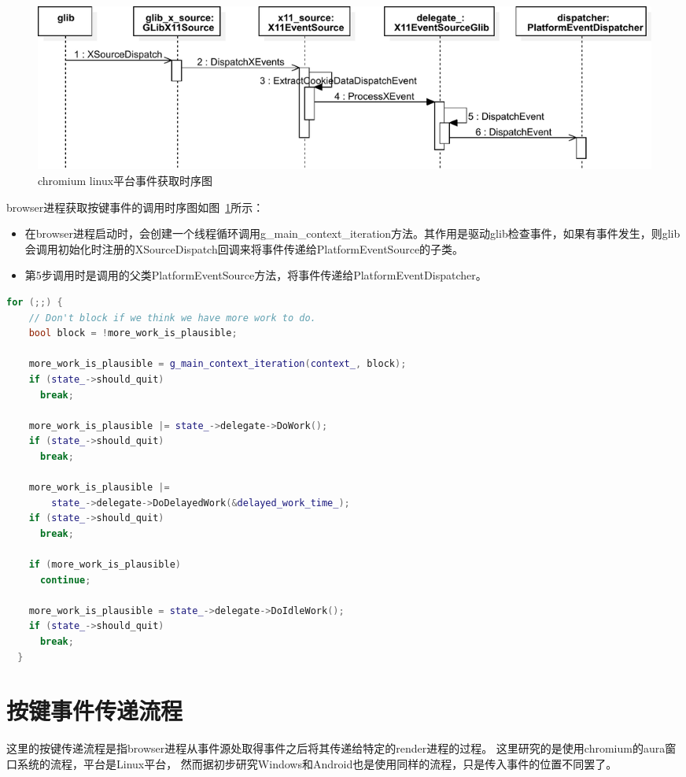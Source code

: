 \documentclass[12pt]{article}
\begin{document}
\begin{figure}[H] 
  \centering 
  \includegraphics[width=\textwidth]{image/linux_get_event_from_source.pdf} 
  \caption{chromium linux平台事件获取时序图} \label{fig:linux_get_event_from_source} 
\end{figure}

browser进程获取按键事件的调用时序图如图~\ref{fig:linux_get_event_from_source}所示：
\begin{itemize}
  \item 在browser进程启动时，会创建一个线程循环调用g\_main\_context\_iteration方法。其作用是驱动glib检查事件，如果有事件发生，则glib会调用初始化时注册的XSourceDispatch回调来将事件传递给PlatformEventSource的子类。
  \item 第5步调用时是调用的父类PlatformEventSource方法，将事件传递给PlatformEventDispatcher。
\end{itemize}

\begin{spacing}{1.0}
\begin{lstlisting}[language={C++}]
  for (;;) {
    // Don't block if we think we have more work to do.
    bool block = !more_work_is_plausible;

    more_work_is_plausible = g_main_context_iteration(context_, block);
    if (state_->should_quit)
      break;

    more_work_is_plausible |= state_->delegate->DoWork();
    if (state_->should_quit)
      break;

    more_work_is_plausible |=
        state_->delegate->DoDelayedWork(&delayed_work_time_);
    if (state_->should_quit)
      break;

    if (more_work_is_plausible)
      continue;

    more_work_is_plausible = state_->delegate->DoIdleWork();
    if (state_->should_quit)
      break;
  }
\end{lstlisting}
\end{spacing}

\section{按键事件传递流程}
这里的按键传递流程是指browser进程从事件源处取得事件之后将其传递给特定的render进程的过程。
这里研究的是使用chromium的aura窗口系统的流程，平台是Linux平台，
然而据初步研究Windows和Android也是使用同样的流程，只是传入事件的位置不同罢了。
\end{document}
